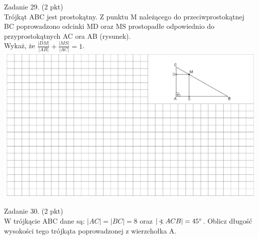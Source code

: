 \documentclass[10pt]{article}
\newcommand\Varangle{\mathop{{<\!\!\!\!\!\text{\small)}}\:}\nolimits}
\begin{document}
Zadanie 29. (2 pkt)\\
Trójkąt ABC jest prostokątny. Z punktu M należącego do przeciwprostokątnej BC poprowadzono odcinki MD oraz MS prostopadłe odpowiednio do przyprostokątnych AC ora AB (rysunek).\\
Wykaż, że \(\frac{|D M|}{|A B|}+\frac{|M S|}{|A C|}=1\).\\
\includegraphics[max width=\textwidth, center]{2024_11_21_87037534e5fdc524263ag-09}

Zadanie 30. (2 pkt)\\
W trójkącie ABC dane są: \(|A C|=|B C|=8\) oraz \(|\Varangle A C B|=45^{\circ}\). Oblicz długość wysokości tego trójkąta poprowadzonej z wierzchołka A.
\end{document}
